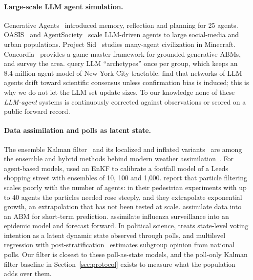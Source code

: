 \documentclass[11pt]{article}
\begin{document}
\paragraph{Large-scale LLM agent simulation.} Generative Agents~\citep{park2023generative} introduced memory, reflection and planning for 25 agents. OASIS~\citep{yang2024oasis} and AgentSociety~\citep{piao2025agentsociety} scale LLM-driven agents to large social-media and urban populations. Project Sid~\citep{altera2024sid} studies many-agent civilization in Minecraft. Concordia~\citep{vezhnevets2023concordia} provides a game-master framework for grounded generative ABMs, and \citet{gao2023survey} survey the area. \citet{chopra2024limits} query LLM ``archetypes'' once per group, which keeps an 8.4-million-agent model of New York City tractable. \citet{chuang2023opinion} find that networks of LLM agents drift toward scientific consensus unless confirmation bias is induced; this is why we do not let the LLM set update sizes. To our knowledge none of these \emph{LLM-agent} systems is continuously corrected against observations or scored on a public forward record.

\paragraph{Data assimilation and polls as latent state.} The ensemble Kalman filter~\citep{evensen1994sequential} and its localized and inflated variants~\citep{houtekamer2001sequential,anderson2001ensemble,hunt2007efficient} are among the ensemble and hybrid methods behind modern weather assimilation~\citep{bauer2015quiet}. For agent-based models, \citet{ward2016dynamic} used an EnKF to calibrate a footfall model of a Leeds shopping street with ensembles of 10, 100 and 1,000. \citet{malleson2020crowds} report that particle filtering scales poorly with the number of agents: in their pedestrian experiments with up to 40 agents the particles needed rose steeply, and they extrapolate exponential growth, an extrapolation that has not been tested at scale. \citet{kieu2020dealing} assimilate data into an ABM for short-term prediction. \citet{shaman2012forecasting} assimilate influenza surveillance into an epidemic model and forecast forward. In political science, \citet{linzer2013dynamic} treats state-level voting intention as a latent dynamic state observed through polls, and multilevel regression with post-stratification~\citep{park2004bayesian} estimates subgroup opinion from national polls. Our filter is closest to these poll-as-state models, and the poll-only Kalman filter baseline in Section~\ref{sec:protocol} exists to measure what the population adds over them.
\end{document}
